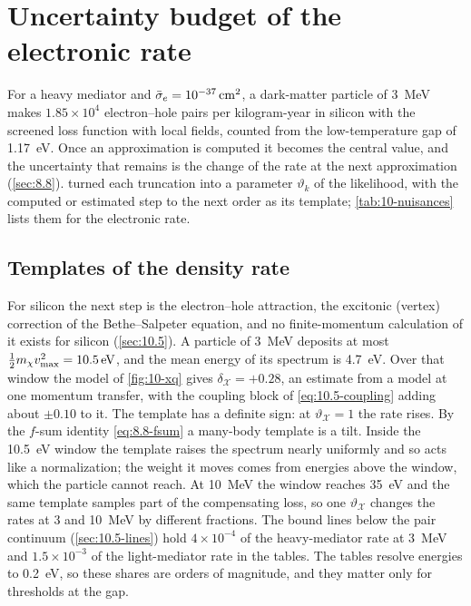 \section{Uncertainty budget of the electronic rate}\label{sec:10.10}

For a heavy mediator and $\bar{\sigma}_{e} = \SI{e-37}{cm^2}$, a dark-matter particle of \SI{3}{MeV} makes $1.85\times10^4$ electron--hole pairs per kilogram-year in silicon with the screened loss function with local fields, counted from the low-temperature gap of \SI{1.17}{eV}. Once an approximation is computed it becomes the central value, and the uncertainty that remains is the change of the rate at the next approximation (\cref{sec:8.8}).  turned each truncation into a parameter $\vartheta_k$ of the likelihood, with the computed or estimated step to the next order as its template; \cref{tab:10-nuisances} lists them for the electronic rate.

\subsection{Templates of the density rate}\label{sec:10.10-manybody}

For silicon the next step is the electron--hole attraction, the excitonic (vertex) correction of the Bethe--Salpeter equation, and no finite-momentum calculation of it exists for silicon (\cref{sec:10.5}). A particle of \SI{3}{MeV} deposits at most $\tfrac12m_{\chi} v_{\mathrm{max}}^2 = \SI{10.5}{eV}$, and the mean energy of its spectrum is \SI{4.7}{eV}. Over that window the model of \cref{fig:10-xq} gives $\delta_{\mathcal{X}} = +0.28$, an estimate from a model at one momentum transfer, with the coupling block of \cref{eq:10.5-coupling} adding about $\pm0.10$ to it. The template has a definite sign: at $\vartheta_{\mathcal{X}} = 1$ the rate rises. By the $f$-sum identity \cref{eq:8.8-fsum} a many-body template is a tilt. Inside the \SI{10.5}{eV} window the template raises the spectrum nearly uniformly and so acts like a normalization; the weight it moves comes from energies above the window, which the particle cannot reach. At \SI{10}{MeV} the window reaches \SI{35}{eV} and the same template samples part of the compensating loss, so one $\vartheta_{\mathcal{X}}$ changes the rates at 3 and \SI{10}{MeV} by different fractions. The bound lines below the pair continuum (\cref{sec:10.5-lines}) hold $4\times10^{-4}$ of the heavy-mediator rate at \SI{3}{MeV} and $1.5\times10^{-3}$ of the light-mediator rate in the tables. The tables resolve energies to \SI{0.2}{eV}, so these shares are orders of magnitude, and they matter only for thresholds at the gap.


